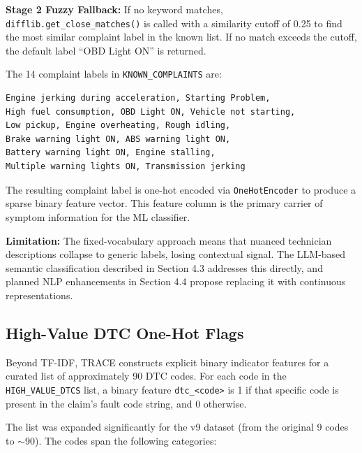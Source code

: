 \documentclass[10pt]{article}
\begin{document}
\textbf{Stage 2 Fuzzy Fallback:} If no keyword matches, \texttt{difflib.get\_close\_matches()} is called with a similarity cutoff of 0.25 to find the most similar complaint label in the known list. If no match exceeds the cutoff, the default label ``OBD Light ON'' is returned.

The 14 complaint labels in \texttt{KNOWN\_COMPLAINTS} are:

\begin{verbatim}
Engine jerking during acceleration, Starting Problem,
High fuel consumption, OBD Light ON, Vehicle not starting,
Low pickup, Engine overheating, Rough idling,
Brake warning light ON, ABS warning light ON,
Battery warning light ON, Engine stalling,
Multiple warning lights ON, Transmission jerking
\end{verbatim}

The resulting complaint label is one-hot encoded via \texttt{OneHotEncoder} to produce a sparse binary feature vector. This feature column is the primary carrier of symptom information for the ML classifier.

\textbf{Limitation:} The fixed-vocabulary approach means that nuanced technician descriptions collapse to generic labels, losing contextual signal. The LLM-based semantic classification described in Section 4.3 addresses this directly, and planned NLP enhancements in Section 4.4 propose replacing it with continuous representations.

\subsection{High-Value DTC One-Hot Flags}

Beyond TF-IDF, TRACE constructs explicit binary indicator features for a curated list of approximately 90 DTC codes. For each code in the \texttt{HIGH\_VALUE\_DTCS} list, a binary feature \texttt{dtc\_<code>} is 1 if that specific code is present in the claim's fault code string, and 0 otherwise.

The list was expanded significantly for the v9 dataset (from the original 9 codes to $\sim$90). The codes span the following categories:
\end{document}
